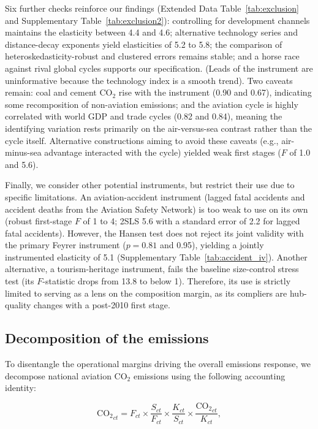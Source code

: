 \documentclass[12pt]{extarticle}
\begin{document}
Six further checks reinforce our findings (Extended Data Table~\ref{tab:exclusion} and Supplementary Table~\ref{tab:exclusion2}): controlling for development channels maintains the elasticity between 4.4 and 4.6; alternative technology series and distance-decay exponents yield elasticities of 5.2 to 5.8; the comparison of heteroskedasticity-robust and clustered errors remains stable; and a horse race against rival global cycles supports our specification. (Leads of the instrument are uninformative because the technology index is a smooth trend). Two caveats remain: coal and cement CO$_2$ rise with the instrument (0.90 and 0.67), indicating some recomposition of non-aviation emissions; and the aviation cycle is highly correlated with world GDP and trade cycles (0.82 and 0.84), meaning the identifying variation rests primarily on the air-versus-sea contrast rather than the cycle itself. Alternative constructions aiming to avoid these caveats (e.g., air-minus-sea advantage interacted with the cycle) yielded weak first stages ($F$ of 1.0 and 5.6).

Finally, we consider other potential instruments, but restrict their use due to specific limitations. 
An aviation-accident instrument (lagged fatal accidents and accident deaths from the Aviation Safety Network) is too weak to use on its own (robust first-stage $F$ of 1 to 4; 2SLS 5.6 with a standard error of 2.2 for lagged fatal accidents). However, the Hansen test does not reject its joint validity with the primary Feyrer instrument ($p = 0.81$ and 0.95), yielding a jointly instrumented elasticity of 5.1 (Supplementary Table~\ref{tab:accident_iv}). 
Another alternative, a tourism-heritage instrument, fails the baseline size-control stress test (its $F$-statistic drops from 13.8 to below 1). Therefore, its use is strictly limited to serving as a lens on the composition margin, as its compliers are hub-quality changes with a post-2010 first stage.




\subsection*{Decomposition of the emissions}

To disentangle the operational margins driving the overall emissions response, we decompose national aviation CO$_2$ emissions using the following accounting identity:

\begin{equation}
\mathrm{CO_2}_{ct} = F_{ct} \times \frac{S_{ct}}{F_{ct}} \times
\frac{K_{ct}}{S_{ct}} \times \frac{\mathrm{CO_2}_{ct}}{K_{ct}},
\label{eq:identity}
\end{equation}
\end{document}
